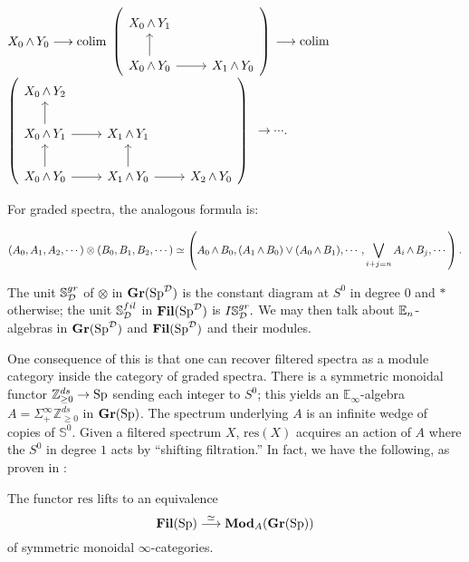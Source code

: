 \begin{center}
$X_0 \operatorname{\wedge} Y_0 \longrightarrow \operatorname*{\mathrm{colim}} $
{$ \left(\begin{tikzcd} X_0 \smsh Y_1 \\  X_0 \smsh Y_0 \arrow{u} \arrow{r} & X_1 \smsh Y_0 \end{tikzcd} \right) $} 
$\longrightarrow \operatorname*{\mathrm{colim}}$
 {$ \left( \begin{tikzcd} X_0 \smsh Y_2 \\ X_0 \smsh Y_1 \arrow{r} \arrow{u} & X_1 \smsh Y_1  \\ X_0 \smsh Y_0 \arrow{r} \arrow{u} & X_1 \smsh Y_0 \arrow{u} \arrow{r} & X_2 \smsh Y_0 \end{tikzcd} \right) $}
$\longrightarrow \cdots.$
\end{center}

For graded spectra, the analogous formula is:

$$(A_0,A_1,A_2,\cdots) \otimes (B_0,B_1,B_2,\cdots) \simeq \left( A_0 \operatorname{\wedge} B_0, (A_1 \operatorname{\wedge} B_0) \vee (A_0 \operatorname{\wedge} B_1), \cdots, \bigvee_{i+j=n} A_i \operatorname{\wedge} B_j, \cdots \right).$$


The unit $\mathbb{S}^{gr}_{\operatorname{\mathcal{D}}}$ of $\otimes$ in $\operatorname{\mathbf{Gr}}(\operatorname{\mathrm{Sp}}^{\operatorname{\mathcal{D}}})$ is the constant diagram at $S^0$ in degree 0 and $*$ otherwise; the unit $\mathbb{S}^{fil}_{\operatorname{\mathcal{D}}}$ in $\operatorname{\mathbf{Fil}}(\operatorname{\mathrm{Sp}}^{\operatorname{\mathcal{D}}})$ is $I\mathbb{S}^{gr}_{\operatorname{\mathcal{D}}}.$  We may then talk about $\operatorname{\mathbb{E}}_n$-algebras in $\operatorname{\mathbf{Gr}}(\operatorname{\mathrm{Sp}}^{\operatorname{\mathcal{D}}})$ and $\operatorname{\mathbf{Fil}}(\operatorname{\mathrm{Sp}}^{\operatorname{\mathcal{D}}})$ and their modules.

\begin{rmk}
One consequence of this is that one can recover filtered spectra as a module category inside the category of graded spectra.  There is a symmetric monoidal functor $\mathbb{Z}^{ds}_{\ge 0} \to \operatorname{\mathrm{Sp}}$ sending each integer to $S^0$; this yields an $\mathbb{E}_\infty$-algebra $A=\Sigma^{\infty}_+ \mathbb{Z}^{ds}_{\ge 0}$ in $\operatorname{\mathbf{Gr}}(\operatorname{\mathrm{Sp}})$.  The spectrum underlying $A$ is an infinite wedge of copies of $\mathbb{S}^0$.  Given a filtered spectrum $X$, $\mathrm{res }(X)$ acquires an action of $A$ where the $S^0$ in degree $1$ acts by ``shifting filtration.''  In fact, we have the following, as proven in \cite[Proposition 3.1.6]{LurieRot}:

\begin{lem} \label{lem:FilAsGrMod}
The functor $\mathrm{res}$ lifts to an equivalence
$$\operatorname{\mathbf{Fil}}(\operatorname{\mathrm{Sp}}) \stackrel{\simeq}{\longrightarrow} \mathbf{Mod}_{A}(\operatorname{\mathbf{Gr}}(\operatorname{\mathrm{Sp}}))$$
of symmetric monoidal $\infty$-categories.
\end{lem}
\end{rmk}  


